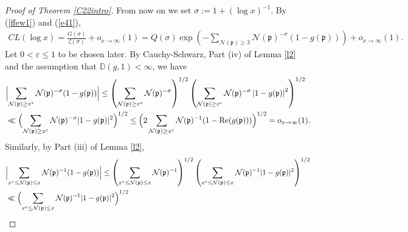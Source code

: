 \documentclass[11pt]{amsart}
\theoremstyle{definition}
\newcommand{\D}{{\mathbb D}}
\newcommand{\NN}{{\mathcal N}}
\newcommand{\mf}{\mathfrak}
\newcommand{\WS}[1]{{\color{blue}{{#1}}}}
\begin{document}
\begin{proof}[Proof of Theorem \ref{C22intro}]
 From now on we set  
   $\sigma:=1+(\log x)^{-1}$. By (\ref{ffew1}) and (\ref{e41}),
 \begin{equation}\label{CL}
   \begin{split}
  CL(\log x)=\frac{G(\sigma)}{\zeta(\sigma)}+o_{x\to\infty}(1)=Q(\sigma)\exp\left(-\sum_{\NN(\mf p)\geq 3}\NN(\mf p)^{-\sigma}(1-g(\mf p))\right)+o_{x\to\infty}(1).
   \end{split}
   \end{equation}
   Let $0<\varepsilon\leq 1$ to be chosen later. By Cauchy-Schwarz, Part (iv) of Lemma \ref{l2} and the assumption that  $\D(g,1)<\infty$, we have
   \begin{equation}\nonumber
   \begin{split}
    & \Bigl\vert\sum_{\NN(\mf p)\geq x^{\varepsilon}}\NN(\mf p)^{-\sigma}(1-g(\mf p))\Bigr\vert
     \leq \left(\sum_{\NN(\mf p)\geq x^{\varepsilon}}\NN(\mf p)^{-\sigma}\right)^{1/2}\left(\sum_{\NN(\mf p)\geq x^{\epsilon}}\NN(\mf p)^{-\sigma}\left| 1-g(\mf p)\right|^{2}\right)^{1/2}
    \\&\ll \Bigl(\sum_{\NN(\mf p)\geq x^{\varepsilon}}\NN(\mf p)^{-\sigma}\vert 1-g(\mf p)\vert^{2}\Bigr)^{1/2}  
     \leq \Bigl(2\sum_{\NN(\mf p)\geq x^{\varepsilon}}\NN(\mf p)^{-1}(1-\text{Re}(g(\mf p)))\Bigr)^{1/2}=o_{x\to\infty}(1).
   \end{split}
   \end{equation}
 Similarly, by Part (iii) of Lemma \ref{l2}, %
    \begin{equation}\nonumber
   \begin{split}
    & \Bigl\vert\sum_{x^{\varepsilon}\leq \NN(\mf p)\leq x}\NN(\mf p)^{-1}(1-g(\mf p))\Bigr\vert
    \leq \left(\sum_{x^{\varepsilon}\leq \NN(\mf p)\leq x}\NN(\mf p)^{-1}\right)^{1/2}\left(\sum_{x^{\epsilon}\leq \NN(\mf p)\leq x}\NN(\mf p)^{-1}\vert 1-g(\mf p)\vert^{2}\right)^{1/2}
    \\&\ll \Bigl(\sum_{x^{\varepsilon}\leq \NN(\mf p)\leq x}\NN(\mf p)^{-1}\vert 1-g(\mf p)\vert^{2} \Bigr)^{1/2}

\end{split}
\end{equation}
\end{proof}
\end{document}
